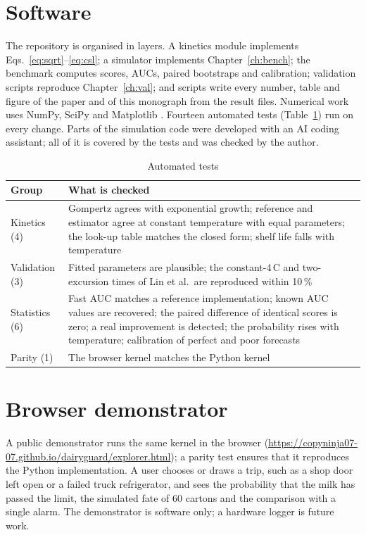 \documentclass[11pt,a4paper,twoside,openany]{book}
\newcommand{\degC}{\,\textdegree C}
\theoremstyle{plain}\newtheorem{proposition}{Proposition}\newtheorem{corollary}{Corollary}
\theoremstyle{definition}\newtheorem{definition}{Definition}[chapter]
\begin{document}
\section{Software}
The repository is organised in layers. A kinetics module implements Eqs.~\eqref{eq:sqrt}--\eqref{eq:csl}; a simulator implements Chapter~\ref{ch:bench}; the benchmark computes scores, AUCs, paired bootstraps and calibration; validation scripts reproduce Chapter~\ref{ch:val}; and scripts write every number, table and figure of the paper and of this monograph from the result files. Numerical work uses NumPy, SciPy and Matplotlib \cite{harris2020,virtanen2020,hunter2007}. Fourteen automated tests (Table~\ref{tab:tests}) run on every change. Parts of the simulation code were developed with an AI coding assistant; all of it is covered by the tests and was checked by the author.

\begin{table}[!htbp]\centering\footnotesize
\caption{Automated tests}\label{tab:tests}
\begin{tabular}{@{}p{2.6cm}p{11.2cm}@{}}\toprule\rowcolor{dghead}
Group & What is checked\\\midrule
Kinetics (4) & Gompertz agrees with exponential growth; reference and estimator agree at constant temperature with equal parameters; the look-up table matches the closed form; shelf life falls with temperature\\
Validation (3) & Fitted parameters are plausible; the constant-4\degC{} and two-excursion times of Lin et al.\ are reproduced within 10\,\%\\
Statistics (6) & Fast AUC matches a reference implementation; known AUC values are recovered; the paired difference of identical scores is zero; a real improvement is detected; the probability rises with temperature; calibration of perfect and poor forecasts\\
Parity (1) & The browser kernel matches the Python kernel\\
\bottomrule\end{tabular}\end{table}

\section{Browser demonstrator}
A public demonstrator runs the same kernel in the browser (\url{https://copyninja07-07.github.io/dairyguard/explorer.html}); a parity test ensures that it reproduces the Python implementation. A user chooses or draws a trip, such as a shop door left open or a failed truck refrigerator, and sees the probability that the milk has passed the limit, the simulated fate of 60 cartons and the comparison with a single alarm. The demonstrator is software only; a hardware logger is future work.
\end{document}
